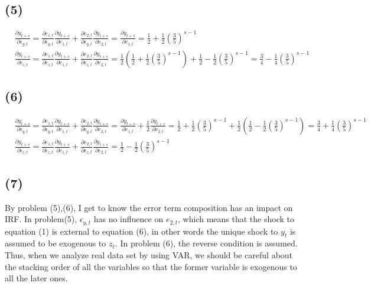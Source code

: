 \documentclass{article}
\begin{document}
\subsection{(5)}
\begin{align*}
	&\frac{\partial y_{t+s}}{\partial \epsilon_{y, t}} = \frac{\partial e_{1,t}}{\partial \epsilon_{y, t}} \frac{\partial y_{t+s}}{\partial e_{1, t}} + \frac{\partial e_{2,t}}{\partial \epsilon_{y, t}} \frac{\partial y_{t+s}}{\partial e_{2, t}} = \frac{\partial y_{t+s}}{\partial e_{1, t}} = \frac{1}{2} + \frac{1}{2} \left( \frac{3}{5} \right)^{s-1}\\[8pt]
	&\frac{\partial y_{t+s}}{\partial \epsilon_{z, t}} = \frac{\partial e_{1,t}}{\partial \epsilon_{z, t}} \frac{\partial y_{t+s}}{\partial e_{1, t}} + \frac{\partial e_{2,t}}{\partial \epsilon_{z, t}} \frac{\partial y_{t+s}}{\partial e_{2, t}} = \frac{1}{2}\left(  \frac{1}{2} + \frac{1}{2} \left( \frac{3}{5} \right)^{s-1}\right) + \frac{1}{2} -\frac{1}{2} \left( \frac{3}{5}\right)^{s-1} = \frac{3}{4} - \frac{1}{4} \left( \frac{3}{5} \right)^{s-1}
\end{align*}

\subsection{(6)}
\begin{align*}
	&\frac{\partial y_{t+s}}{\partial \epsilon_{y, t}} = \frac{\partial e_{1,t}}{\partial \epsilon_{y, t}} \frac{\partial y_{t+s}}{\partial e_{1, t}} + \frac{\partial e_{2,t}}{\partial \epsilon_{y, t}} \frac{\partial y_{t+s}}{\partial e_{2, t}} = \frac{\partial y_{t+s}}{\partial e_{1, t}} + \frac{1}{2} \frac{\partial y_{t+s}}{\partial e_{2, t}}= \frac{1}{2} + \frac{1}{2} \left( \frac{3}{5} \right)^{s-1} + \frac{1}{2} \left( \frac{1}{2} -\frac{1}{2} \left( \frac{3}{5}\right)^{s-1} \right) = \frac{3}{4}+\frac{1}{4}\left( \frac{3}{5} \right)^{s-1} \\[8pt]
	&\frac{\partial y_{t+s}}{\partial \epsilon_{z, t}} = \frac{\partial e_{1,t}}{\partial \epsilon_{z, t}} \frac{\partial y_{t+s}}{\partial e_{1, t}} + \frac{\partial e_{2,t}}{\partial \epsilon_{z, t}} \frac{\partial y_{t+s}}{\partial e_{2, t}} = \frac{1}{2} -\frac{1}{2} \left( \frac{3}{5}\right)^{s-1} 
\end{align*}


\subsection{(7)}
By problem (5),(6), I get to know the error term composition has an impact on IRF. In problem(5), $\epsilon_{y,t}$ has no influence on $e_{2, t}$, which means that the shock to equation (1) is external to equation (6), in other words the unique shock to $y_t$ is assumed to be exogenous to $z_t$. In problem (6), the reverse condition is assumed. Thus, when we analyze real data set by using VAR, we should be careful about the stacking order of all the variables so that the former variable is exogenous to all the later ones. 
\end{document}
